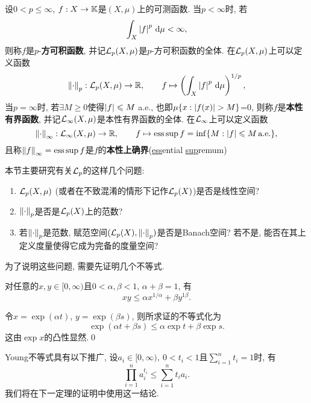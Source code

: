 	\begin{Definition}[$ \CL_p $空间]\label{def:Lp空间}
		设$ 0<p\leqslant\infty $, $ f : X\to\mathbb{K} $是$ (X,\mu) $上的可测函数. 当$ p<\infty $时, 若
		\[
		\int_X\left| f \right| ^p\,\mathrm{d}\mu<\infty,
		\]
		则称$ f $是$ p $-\textbf{方可积函数}, 并记$ \mathcal{L}_p(X,\mu) $是$ p $-方可积函数的全体. 在$ \mathcal{L}_p(X,\mu) $上可以定义函数
		\[
		\left\| \cdot \right\|_p : \mathcal{L}_p(X,\mu)\to\mathbb{R},\qquad f\mapsto\left(\int_X\left| f \right| ^p\,\mathrm{d}\mu\right)^{1/p},
		\]
		当$ p=\infty $时, 若$ \exists M\geqslant 0 $使得$ \left| f \right| \leqslant M $ a.e., 也即$ \mu\{ x : \left| f(x) \right| >M \} $=0, 则称$ f $是\textbf{本性有界函数}, 并记$ \mathcal{L}_\infty(X,\mu) $是本性有界函数的全体. 在$ \mathcal{L}_\infty $上可以定义函数
		\[
		\left\| \cdot \right\|_\infty : \mathcal{L}_\infty(X,\mu)\to\mathbb{R},\qquad f\mapsto\operatorname{ess\,sup} f=\inf\{ M : \left| f \right| \leqslant M \text{\,a.e.} \},
		\]
		且称$ \left\| f \right\|_\infty=\operatorname{ess\,sup} f $是$ f $的\textbf{本性上确界}(\underline{ess}ential \underline{sup}remum)
	\end{Definition}
	
	本节主要研究有关$ \CL_p $的这样几个问题:
	\begin{enumerate}[(1)]
	\item $ \mathcal{L}_p(X,\mu) $ (或者在不致混淆的情形下记作$ \mathcal{L}_p(X) $)是否是线性空间?\label{item:1.7节主要问题1}
	\item $ \left\| \cdot \right\|_p $是否是$ \mathcal{L}_p(X) $上的范数?\label{item:1.7节主要问题2}
	\item 若$ \left\| \cdot \right\|_p $是范数, 赋范空间$ (\mathcal{L}_p(X),\left\| \cdot \right\|_p) $是否是Banach空间? 若不是, 能否在其上定义度量使得它成为完备的度量空间?\label{item:1.7节主要问题3}
	\end{enumerate}
	为了说明这些问题, 需要先证明几个不等式.
	
	\begin{Lemma}[Young]
	对任意的$ x, y\in[0,\infty) $且$ 0<\alpha,\beta<1 $, $ \alpha+\beta=1 $, 有
	\[
	xy\leqslant \alpha x^{1/\alpha}+\beta y^{1\beta}.
	\]
	\end{Lemma}
	\begin{Proof}
	令$ x=\exp(\alpha t) $, $ y=\exp(\beta s) $, 则所求证的不等式化为
	\[
	\exp(\alpha t+\beta s)\leqslant\alpha\exp t+\beta\exp s.
	\]
	这由$ \exp x $的凸性显然.\qed
	\end{Proof}
	
	\begin{Remark}
	Young不等式具有以下推广, 设$ a_i\in[0,\infty),\ 0<t_i<1 $且$ \sum\limits_{i=1}^nt_i=1 $时, 有
	\[
	\prod_{i=1}^na_i^{t_i}\leqslant\sum_{i=1}^nt_ia_i.
	\]
	我们将在下一定理的证明中使用这一结论.
	\end{Remark}
	
